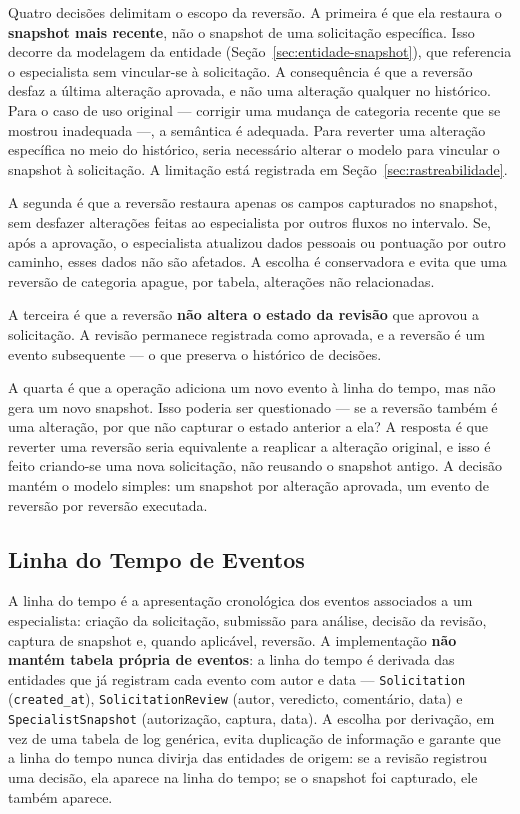 Quatro decisões delimitam o escopo da reversão. A primeira é que ela 
restaura o \textbf{snapshot mais recente}, não o snapshot de uma 
solicitação específica. Isso decorre da modelagem da entidade 
(Seção~\ref{sec:entidade-snapshot}), que referencia o especialista sem 
vincular-se à solicitação. A consequência é que a reversão desfaz a 
última alteração aprovada, e não uma alteração qualquer no histórico. 
Para o caso de uso original — corrigir uma mudança de categoria recente 
que se mostrou inadequada —, a semântica é adequada. Para reverter uma 
alteração específica no meio do histórico, seria necessário alterar o 
modelo para vincular o snapshot à solicitação. A limitação está 
registrada em Seção~\ref{sec:rastreabilidade}.

A segunda é que a reversão restaura apenas os campos capturados no 
snapshot, sem desfazer alterações feitas ao especialista por outros 
fluxos no intervalo. Se, após a aprovação, o especialista atualizou 
dados pessoais ou pontuação por outro caminho, esses dados não são 
afetados. A escolha é conservadora e evita que uma reversão de categoria 
apague, por tabela, alterações não relacionadas.

A terceira é que a reversão \textbf{não altera o estado da revisão} que 
aprovou a solicitação. A revisão permanece registrada como aprovada, e 
a reversão é um evento subsequente — o que preserva o histórico de 
decisões.

A quarta é que a operação adiciona um novo evento à linha do tempo, mas 
não gera um novo snapshot. Isso poderia ser questionado — se a reversão 
também é uma alteração, por que não capturar o estado anterior a ela? A 
resposta é que reverter uma reversão seria equivalente a reaplicar a 
alteração original, e isso é feito criando-se uma nova solicitação, não 
reusando o snapshot antigo. A decisão mantém o modelo simples: um 
snapshot por alteração aprovada, um evento de reversão por reversão 
executada.

\subsection{Linha do Tempo de Eventos}
\label{sec:timeline}

A linha do tempo é a apresentação cronológica dos eventos associados a 
um especialista: criação da solicitação, submissão para análise, decisão 
da revisão, captura de snapshot e, quando aplicável, reversão. A 
implementação \textbf{não mantém tabela própria de eventos}: a linha do 
tempo é derivada das entidades que já registram cada evento com autor e 
data — \texttt{Solicitation} (\texttt{created\_at}), 
\texttt{SolicitationReview} (autor, veredicto, comentário, data) e 
\texttt{SpecialistSnapshot} (autorização, captura, data). A escolha por 
derivação, em vez de uma tabela de log genérica, evita duplicação de 
informação e garante que a linha do tempo nunca divirja das entidades de 
origem: se a revisão registrou uma decisão, ela aparece na linha do 
tempo; se o snapshot foi capturado, ele também aparece.

